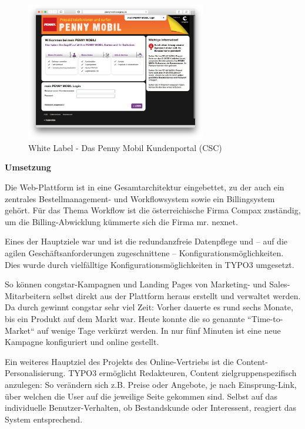 \documentclass[11pt,a4paper]{article} %
\begin{document}
\begin{figure}[H]
\includegraphics[width=0.7\textwidth]{images/Sites/White_Label/Penny_Mobil_CSC.png}
\centering
\caption{White Label - Das Penny Mobil Kundenportal (CSC) \cite{pencsc}}
\end{figure}

\pagebreak

\begin{center}
\textbf{Umsetzung}
\end{center}

Die Web-Plattform ist in eine Gesamtarchitektur eingebettet, zu der auch ein zentrales Bestellmanagement- und Workflowsystem sowie ein Billingsystem gehört. Für das Thema Workflow ist die österreichische Firma Compax zuständig, um die Billing-Abwicklung kümmerte sich die Firma mr. nexnet.

Eines der Hauptziele war und ist die redundanzfreie Datenpflege und – auf die agilen Geschäftsanforderungen zugeschnittene – Konfigurationsmöglichkeiten. Dies wurde durch vielfälltige Konfigurationsmöglichkeiten in TYPO3 umgesetzt.

So können congstar-Kampagnen und Landing Pages von Marketing- und Sales-Mitarbeitern selbst direkt aus der Plattform heraus erstellt und verwaltet werden. Da durch gewinnt congstar sehr viel Zeit: Vorher dauerte es rund sechs Monate, bis ein Produkt auf dem Markt war. Heute konnte die so genannte “Time-to-Market“ auf wenige Tage verkürzt werden. In nur fünf Minuten ist eine neue Kampagne konfiguriert und online gestellt.

Ein weiteres Hauptziel des Projekts des Online-Vertriebs ist die Content-Personalisierung. TYPO3 ermöglicht Redakteuren, Content zielgruppenspezifisch anzulegen: So verändern sich z.B. Preise oder Angebote, je nach Einsprung-Link, über welchen die User auf die jeweilige Seite gekommen sind. Selbst auf das individuelle Benutzer-Verhalten, ob Bestandskunde oder Interessent, reagiert das System entsprechend.
\end{document}
